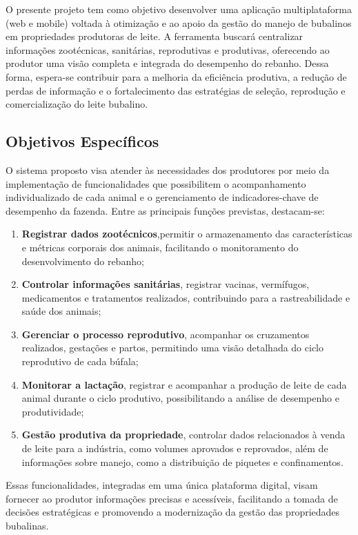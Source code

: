 O presente projeto tem como objetivo desenvolver uma aplicação multiplataforma (web e mobile) voltada à otimização e ao apoio da gestão do manejo de bubalinos em propriedades produtoras de leite. A ferramenta buscará centralizar informações zootécnicas, sanitárias, reprodutivas e produtivas, oferecendo ao produtor uma visão completa e integrada do desempenho do rebanho. Dessa forma, espera-se contribuir para a melhoria da eficiência produtiva, a redução de perdas de informação e o fortalecimento das estratégias de seleção, reprodução e comercialização do leite bubalino.

\subsection{Objetivos Específicos}
O sistema proposto visa atender às necessidades dos produtores por meio da implementação de funcionalidades que possibilitem o acompanhamento individualizado de cada animal e o gerenciamento de indicadores-chave de desempenho da fazenda. Entre as principais funções previstas, destacam-se:
\begin{enumerate}
    \item \textbf{Registrar dados zootécnicos},permitir o armazenamento das características e métricas corporais dos animais, facilitando o monitoramento do desenvolvimento do rebanho;
    \item \textbf{Controlar informações sanitárias}, registrar vacinas, vermífugos, medicamentos e tratamentos realizados, contribuindo para a rastreabilidade e saúde dos animais;
    \item \textbf{Gerenciar o processo reprodutivo}, acompanhar os cruzamentos realizados, gestações e partos, permitindo uma visão detalhada do ciclo reprodutivo de cada búfala;
    \item \textbf{Monitorar a lactação}, registrar e acompanhar a produção de leite de cada animal durante o ciclo produtivo, possibilitando a análise de desempenho e produtividade;
    \item \textbf{Gestão produtiva da propriedade}, controlar dados relacionados à venda de leite para a indústria, como volumes aprovados e reprovados, além de informações sobre manejo, como a distribuição de piquetes e confinamentos.
\end{enumerate}

Essas funcionalidades, integradas em uma única plataforma digital, visam fornecer ao produtor informações precisas e acessíveis, facilitando a tomada de decisões estratégicas e promovendo a modernização da gestão das propriedades bubalinas.